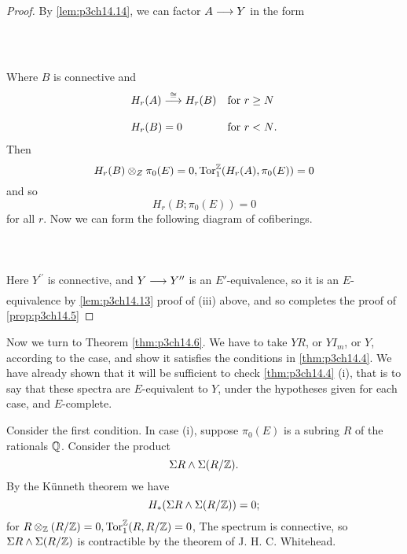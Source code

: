 \documentclass[../main]{subfiles}
\begin{document}
\begin{lemma}
\begin{proof}
  By \ref{lem:p3ch14.14}, we can factor $A\lar{} Y$ in the form
  ~\\~\\
  ~\\~\\
 Where $B$ is connective and 
 \begin{align*}
   &H_{r}(A) \vra{\cong} H_{r}(B)  &&\text{for $r\ge N$}\\[0.5em]
   &H_{r}(B) =  0    &&\text{for $r < N$}.
 \end{align*} 
 Then 
 \[
 H_{r}(B) \otimes_{Z} \pi_{0}(E)=0, \mathrm{Tor}^{\mathbb{Z}}_{1} (H_{r}(A), \pi_{0}(E))=0 
 \] 
 and so 
 \[
   H_{r}(B; \pi_{0}(E))=0 
 \] 
 for all $r$. Now we can form the following diagram of cofiberings.
 ~\\~\\
 ~\\~\\
 Here $Y^{\prime\prime}$ is connective, and $Y \lar{} Y^{\prime\prime}$ is an $E'$-equivalence, so it is an $E$-equivalence by \ref{lem:p3ch14.13} proof of (iii) above, and so completes the proof of  \ref{prop:p3ch14.5}
\end{proof}
\end{lemma}

Now we turn to Theorem \ref{thm:p3ch14.6}. We have to take $YR$, or  $YI_{m}$, or $Y$, according to the case, and show it satisfies the conditions in \ref{thm:p3ch14.4}. We have already shown that it will be sufficient to check \ref{thm:p3ch14.4} (i), that is to say that these spectra are $E$-equivalent to $Y$, under the hypotheses given for each case, and $E$-complete. 

Consider the first condition. In case (i), suppose $\pi_{0}(E)$ is a subring $R$ of the rationals $\mathbb{Q}$. Consider the product 
 \[
  \Sigma R \wedge \Sigma(R/\mathbb{Z}).
\] 
By the K\"unneth theorem we have 
\[
  H_{\ast}(\Sigma R \wedge \Sigma(R /\mathbb{Z})) =0; 
\] 
for $R \otimes_{\mathbb{Z}} (R/ \mathbb{Z})=0, \mathrm{  Tor}^{\mathbb{Z}}_{1}(R, R / \mathbb{Z})=0$, The spectrum is connective, so $\Sigma R \wedge \Sigma(R / \mathbb{Z})$ is contractible by the theorem of J. H. C. Whitehead. 
\end{document}
